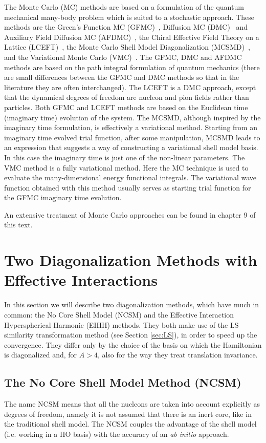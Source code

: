 The Monte Carlo (MC) methods are based on a formulation of the quantum mechanical many-body problem
which is suited to a stochastic approach.  These methods are
the Green's Function MC (GFMC)~\cite{Ka62},  Diffusion MC (DMC)~\cite{Ca87} and Auxiliary Field Diffusion MC (AFDMC)~\cite{ScF99}, 
the Chiral Effective Field Theory on a Lattice (LCEFT)~\cite{Le09},
the Monte Carlo Shell Model Diagonalization (MCSMD)~\cite{KoD97,HoM95,OtH01}, 
and the Variational Monte Carlo (VMC)~\cite{PiW01}. 
The GFMC, DMC and AFDMC methods are based on the path integral formulation of quantum mechanics
(there are small differences between the GFMC and DMC methods so that in the literature they are often interchanged).
The LCEFT is  a DMC approach, except that the dynamical degrees of freedom are nucleon and pion fields rather than particles.
Both GFMC and LCEFT methods are based on the Euclidean time (imaginary time) evolution of the system.  
The MCSMD, although inspired by the imaginary time formulation, is  effectively a variational method. 
Starting from an  imaginary time evolved trial function,  after some manipulation,  MCSMD leads to an expression that suggests 
a way of constructing a variational shell model basis. In this case the imaginary time is just one of the non-linear parameters.
The  VMC method is a fully variational method. Here the MC technique is used to evaluate 
the many-dimensional energy functional integrals. The variational wave function  obtained with this method  
usually serves as starting trial function for the GFMC imaginary time evolution.

An extensive treatment of   Monte Carlo approaches can be found in chapter 9 of this text.

\section{Two Diagonalization Methods with Effective Interactions}\label{sec:TWOEI}

In this section we will describe two diagonalization methods, which have much in common: the No Core Shell Model (NCSM) 
and the Effective Interaction Hyperspherical Harmonic (EIHH) methods. They  both make use of the LS similarity transformation method  
 (see Section \ref{sec:LS}), in order to speed up the convergence. 
They differ only by the choice of the basis on which the Hamiltonian is diagonalized and, 
for $A > 4$, also for the way they treat translation invariance. 

\subsection {The No Core Shell Model Method (NCSM)}\label{sec:NCSM}
The name NCSM means that all the nucleons  are taken into
account  explicitly as degrees of freedom, namely  it is not assumed that there is an inert core, like in the traditional shell model. 
The NCSM couples the  advantage of the shell model (i.e. working in a HO basis) with the accuracy of an {\it ab initio} approach.  

